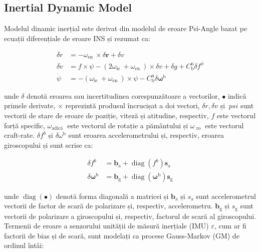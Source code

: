 \documentclass[10pt]{report}
\begin{document}
\subsection*{Inertial Dynamic Model}
Modelul dinamic inerțial este derivat din modelul de eroare Psi-Angle bazat pe ecuații diferențiale de eroare INS și rezumat ca:

\begin{equation}
  \begin{aligned}
    \delta \dot{r} & =-\omega_{\text {en }} \times \delta \boldsymbol{r}+\delta v                                                                                 \\
    \delta \dot{v} & =f \times \psi-\left(2 \omega_{\text {ie }}+\omega_{\text {en }}\right) \times \delta v+\delta g+C_{\mathrm{b}}^{\mathrm{n}} \delta f^{\phi} \\
    \dot{\psi}     & =-\left(\omega_{\text {ie }}+\omega_{\text {en }}\right) \times \psi-C_{\mathrm{b}}^{\mathrm{n}} \delta \boldsymbol{\omega}^{\mathrm{b}}
  \end{aligned}
\end{equation}

unde $\delta$ denotă eroarea sau incertitudinea corespunzătoare a vectorilor, $\bullet$ indică primele derivate, $\times$ reprezintă produsul încrucișat a doi vectori, $\delta r, \delta v$ și $\ psi$ sunt vectorii de stare de eroare de poziție, viteză și atitudine, respectiv, $f$ este vectorul forță specific, $\omega_{\text {adică }}$ este vectorul de rotație a pământului și $\omega_{\text { ro }}$ este vectorul craft-rate. $\delta f^{b}$ și $\delta \omega^{\mathrm{b}}$ sunt eroarea accelerometrului și, respectiv, eroarea giroscopului și sunt scrise ca:


\begin{equation}
  \begin{aligned}
    \delta f^{b}                            & =\boldsymbol{b}_{\mathrm{a}}+\operatorname{diag}\left(f^{b}\right) \boldsymbol{s}_{\mathrm{a}}                            \\
    \delta \boldsymbol{\omega}^{\mathrm{b}} & =\boldsymbol{b}_{\mathrm{g}}+\operatorname{diag}\left(\boldsymbol{\omega}^{\mathrm{b}}\right) \boldsymbol{s}_{\mathrm{g}}
  \end{aligned}
\end{equation}


unde $\operatorname{diag}(\bullet)$ denotă forma diagonală a matricei și $\boldsymbol{b}_{\mathrm{a}}$ și $s_{\mathrm{a}}$ sunt accelerometrul vectorii de factor de scară de polarizare și, respectiv, accelerometru. $\boldsymbol{b}_{\mathrm{g}}$ și $s_{\mathrm{g}}$ sunt vectorii de polarizare a giroscopului și, respectiv, factorul de scară al giroscopului. Termenii de eroare a senzorului unității de măsură inerțiale (IMU) $\varepsilon$, cum ar fi factorii de bias și de scară, sunt modelați ca procese Gauss-Markov (GM) de ordinul întâi:
\end{document}
